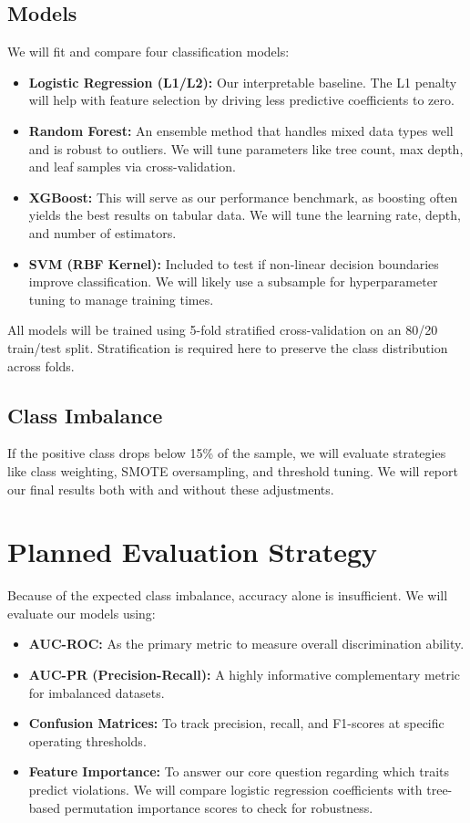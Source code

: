 \documentclass{article}
\begin{document}
\subsection{Models}
We will fit and compare four classification models:

\begin{itemize}
    \item \textbf{Logistic Regression (L1/L2):} Our interpretable baseline. The L1 penalty will help with feature selection by driving less predictive coefficients to zero.
    \item \textbf{Random Forest:} An ensemble method that handles mixed data types well and is robust to outliers. We will tune parameters like tree count, max depth, and leaf samples via cross-validation.
    \item \textbf{XGBoost:} This will serve as our performance benchmark, as boosting often yields the best results on tabular data. We will tune the learning rate, depth, and number of estimators.
    \item \textbf{SVM (RBF Kernel):} Included to test if non-linear decision boundaries improve classification. We will likely use a subsample for hyperparameter tuning to manage training times.
\end{itemize}

All models will be trained using 5-fold stratified cross-validation on an 80/20 train/test split. Stratification is required here to preserve the class distribution across folds.

\subsection{Class Imbalance}
If the positive class drops below 15\% of the sample, we will evaluate strategies like class weighting, SMOTE oversampling, and threshold tuning. We will report our final results both with and without these adjustments.

\section{Planned Evaluation Strategy}

Because of the expected class imbalance, accuracy alone is insufficient. We will evaluate our models using:

\begin{itemize}
    \item \textbf{AUC-ROC:} As the primary metric to measure overall discrimination ability.
    \item \textbf{AUC-PR (Precision-Recall):} A highly informative complementary metric for imbalanced datasets.
    \item \textbf{Confusion Matrices:} To track precision, recall, and F1-scores at specific operating thresholds.
    \item \textbf{Feature Importance:} To answer our core question regarding which traits predict violations. We will compare logistic regression coefficients with tree-based permutation importance scores to check for robustness.
\end{itemize}
\end{document}
